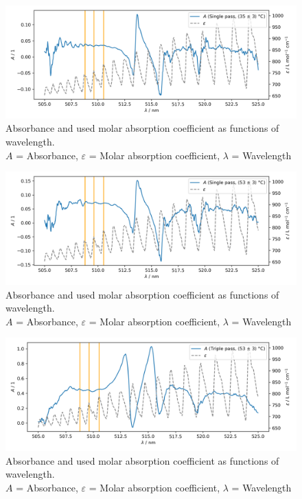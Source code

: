 \begin{figure}[H]
    \centering
    \includegraphics[width=\textwidth]{graphics/absorbance-42.png}
    \caption{Absorbance and used molar absorption coefficient as functions of wavelength.\\
        $A$ = Absorbance, $\varepsilon$ = Molar absorption coefficient, $\lambda$ = Wavelength}
    \label{fig:evaluation:absorbance:single:2}
\end{figure}

\begin{figure}[H]
    \centering
    \includegraphics[width=\textwidth]{graphics/absorbance-60.png}
    \caption{Absorbance and used molar absorption coefficient as functions of wavelength.\\
        $A$ = Absorbance, $\varepsilon$ = Molar absorption coefficient, $\lambda$ = Wavelength}
    \label{fig:evaluation:absorbance:single:3}
\end{figure}

\begin{figure}[H]
    \centering
    \includegraphics[width=\textwidth]{graphics/absorbance-triple.png}
    \caption{Absorbance and used molar absorption coefficient as functions of wavelength.\\
        $A$ = Absorbance, $\varepsilon$ = Molar absorption coefficient, $\lambda$ = Wavelength}
    \label{fig:evaluation:absorbance:triple}
\end{figure}

